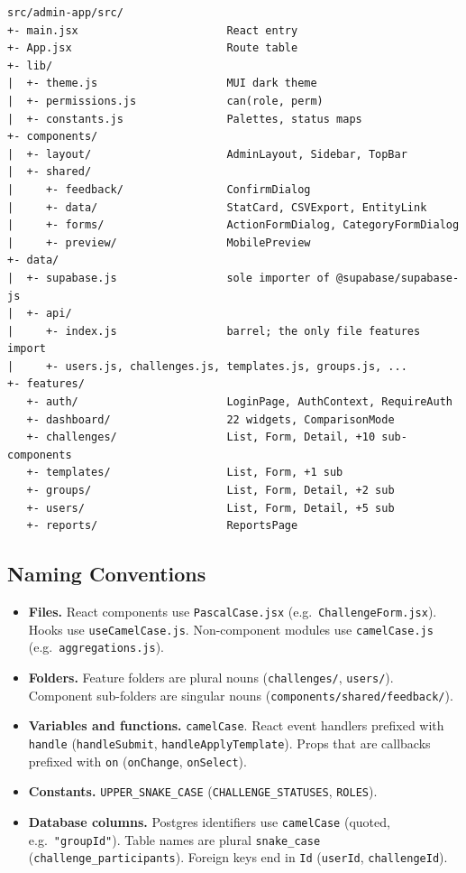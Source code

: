 \documentclass[11pt,letterpaper]{article}
\begin{document}
\begin{lstlisting}[caption={Source tree (abbreviated)},captionpos=b]
src/admin-app/src/
+- main.jsx                       React entry
+- App.jsx                        Route table
+- lib/
|  +- theme.js                    MUI dark theme
|  +- permissions.js              can(role, perm)
|  +- constants.js                Palettes, status maps
+- components/
|  +- layout/                     AdminLayout, Sidebar, TopBar
|  +- shared/
|     +- feedback/                ConfirmDialog
|     +- data/                    StatCard, CSVExport, EntityLink
|     +- forms/                   ActionFormDialog, CategoryFormDialog
|     +- preview/                 MobilePreview
+- data/
|  +- supabase.js                 sole importer of @supabase/supabase-js
|  +- api/
|     +- index.js                 barrel; the only file features import
|     +- users.js, challenges.js, templates.js, groups.js, ...
+- features/
   +- auth/                       LoginPage, AuthContext, RequireAuth
   +- dashboard/                  22 widgets, ComparisonMode
   +- challenges/                 List, Form, Detail, +10 sub-components
   +- templates/                  List, Form, +1 sub
   +- groups/                     List, Form, Detail, +2 sub
   +- users/                      List, Form, Detail, +5 sub
   +- reports/                    ReportsPage
\end{lstlisting}

\subsection{Naming Conventions}

\begin{itemize}[noitemsep]
  \item \textbf{Files.} React components use \texttt{PascalCase.jsx}
        (e.g.\ \texttt{ChallengeForm.jsx}). Hooks use
        \texttt{useCamelCase.js}. Non-component modules use
        \texttt{camelCase.js} (e.g.\ \texttt{aggregations.js}).
  \item \textbf{Folders.} Feature folders are plural nouns
        (\texttt{challenges/}, \texttt{users/}). Component sub-folders
        are singular nouns (\texttt{components/shared/feedback/}).
  \item \textbf{Variables and functions.} \texttt{camelCase}.
        React event handlers prefixed with \texttt{handle}
        (\texttt{handleSubmit}, \texttt{handleApplyTemplate}).
        Props that are callbacks prefixed with \texttt{on}
        (\texttt{onChange}, \texttt{onSelect}).
  \item \textbf{Constants.} \texttt{UPPER\_SNAKE\_CASE}
        (\texttt{CHALLENGE\_STATUSES}, \texttt{ROLES}).
  \item \textbf{Database columns.} Postgres identifiers use
        \texttt{camelCase} (quoted, e.g.\ \texttt{"groupId"}). Table
        names are plural \texttt{snake\_case}
        (\texttt{challenge\_participants}). Foreign keys end in
        \texttt{Id} (\texttt{userId}, \texttt{challengeId}).
\end{itemize}
\end{document}
